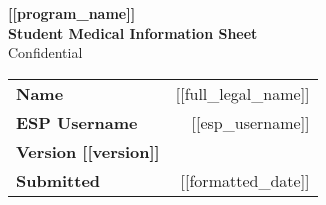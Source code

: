 \documentclass{article}
\begin{document}
\thispagestyle{firstfooter}	%
\rule[-3ex]{0pt}{3ex}		%

\begin{center}
{\large \textbf{[[program_name]] \\
Student Medical Information Sheet}} \\
{\sc Confidential} \\[5mm]

\begin{tabular}{l r}
\textbf{Name } & [[full_legal_name]] \\[-0.5mm]
\textbf{ESP Username } & [[esp_username]] \\[2mm]
\textbf{Version [[version]] } &  \\[-0.5mm]
\textbf{Submitted } & [[formatted_date]] \\
\end{tabular}
\end{center}

\vspace{1cm}
\end{document}

